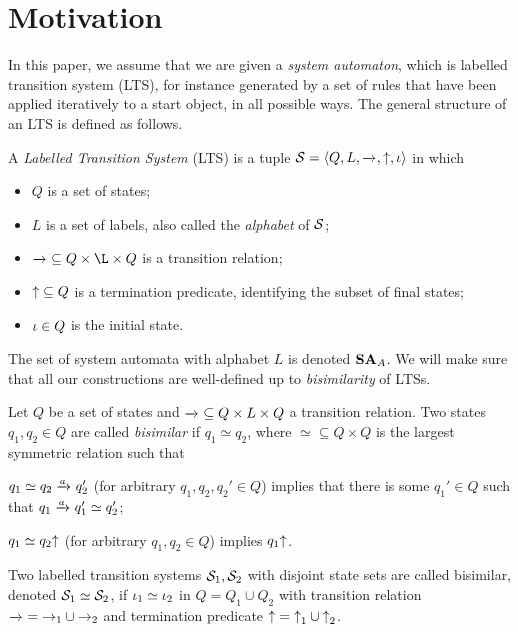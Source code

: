 \section{Motivation}
\label{sec:motivation}

In this paper, we assume that we are given a \emph{system automaton}, which is labelled transition system (LTS), for instance generated by a set of rules that have been applied iteratively to a start object, in all possible ways. The general structure of an LTS is defined as follows.

\begin{definition}[LTS]\label{defL;ts}
A \emph{Labelled Transition System} (LTS) is a tuple $\cS=\tupof{Q, L, {\trans{}}, {\final}, \qinit}$ in which
\begin{itemize}
\item $Q$ is a set of states;
\item $L$ is a set of labels, also called the \emph{alphabet} of $\mathcal{S}$;
\item ${\trans{}}\subseteq Q\times\L\times Q$ is a transition relation;
\item ${{\uparrow}}\subseteq Q$ is a termination predicate, identifying the subset of final states;
\item $\iota\in Q$ is the initial state.
\end{itemize}
\end{definition}
%
The set of system automata with alphabet $L$ is denoted $\mathbf{SA}_A$. We will make sure that all our constructions are well-defined up to \emph{bisimilarity} of LTSs.
%
\begin{definition}[bisimilarity]\label{def:bisimilarity}
Let $Q$ be a set of states and ${\trans{}}\subseteq Q\times L\times Q$ a transition relation. Two states $q_1,q_2\in Q$ are called \emph{bisimilar} if $q_1\simeq q_2$, where ${\simeq}\subseteq Q\times Q$ is the largest symmetric relation such that
\begin{inumerate}
\item $q_1\simeq q_2\trans a q_2'$ (for arbitrary $q_1,q_2,q_2'\in Q$) implies that there is some $q_1'\in Q$ such that $q_1\trans a q_1'\simeq q_2'$;
\item $q_1\simeq q_2{\uparrow}$ (for arbitrary $q_1,q_2\in Q$) implies $q_1{\uparrow}$.
\end{inumerate}

Two labelled transition systems $\mathcal{S}_1,\mathcal{S}_2$ with disjoint state sets are called bisimilar, denoted $\mathcal{S}_1\simeq \mathcal{S}_2$, if $\iota_1\simeq \iota_2$ in $Q=Q_1\cup Q_2$ with transition relation ${\trans{}}={\rightarrow_1}\cup {\rightarrow_2}$ and termination predicate ${{\uparrow}}={{\uparrow}_1}\cup {{\uparrow}_2}$.
\end{definition}
